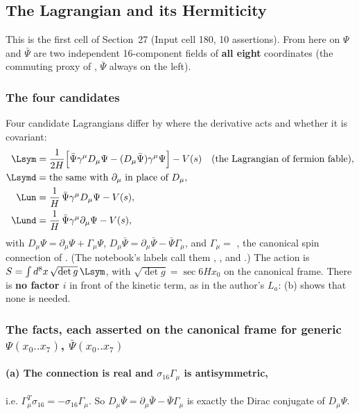 \subsection{The Lagrangian and its Hermiticity}
\label{sec:3.3}

This is the first cell of Section~27 (Input cell 180, 10 assertions). From here on $\Psi$ and
$\bar\Psi$ are two independent 16-component fields of \textbf{all eight} coordinates (the commuting
proxy of , $\bar\Psi$ always on the left).

\subsubsection{The four candidates}
\label{sec:3.3.1}

Four candidate Lagrangians differ by where the derivative acts and whether it is covariant:
\begin{align*}
  \Lsym &= \frac{1}{2H}\Bigl[\bar\Psi\gamma^\mu D_\mu\Psi-(D_\mu\bar\Psi)\gamma^\mu\Psi\Bigr]-V(s)
          &&\text{(the Lagrangian of fermion fable)},\\
  \Lsymd &= \text{the same with } \partial_\mu \text{ in place of } D_\mu,\\
  \Lun &= \frac1H\,\bar\Psi\gamma^\mu D_\mu\Psi-V(s),\\
  \Lund &= \frac1H\,\bar\Psi\gamma^\mu\partial_\mu\Psi-V(s),
\end{align*}
with $D_\mu\Psi=\partial_\mu\Psi+\Gamma_\mu\Psi$, $D_\mu\bar\Psi=\partial_\mu\bar\Psi-\bar\Psi\Gamma_\mu$,
and $\Gamma_\mu=$ , the canonical spin connection of
. (The notebook's labels call them , ,  and
.) The action is $S=\int d^8x\,\sqrt{\det g}\,\Lsym$, with
$\sqrt{\det g}=\sec 6Hx_0$ on the canonical frame. There is \textbf{no factor $i$} in front of the
kinetic term, as in the author's $L_a$: (b) shows that none is needed.

\subsubsection{The facts, each asserted on the canonical frame for generic \texorpdfstring{$\Psi(x_0..x_7)$, $\bar\Psi(x_0..x_7)$}{Psi(x0..x7), Psibar(x0..x7)}}
\label{sec:3.3.2}

\paragraph{(a) The connection is real and $\sigma_{16}\Gamma_\mu$ is antisymmetric,} i.e.
$\Gamma_\mu^{T}\sigma_{16}=-\sigma_{16}\Gamma_\mu$. So $D_\mu\bar\Psi=\partial_\mu\bar\Psi-\bar\Psi\Gamma_\mu$
is exactly the Dirac conjugate of $D_\mu\Psi$. 

